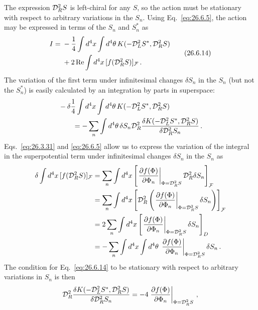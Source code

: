 The expression \(\mathcal{D}_R^2S\) is left-chiral for any \(S\), so the action
must be stationary with respect to arbitrary variations in the \(S_n\). Using
Eq.~\eqref{eq:26.6.5}, the action may be expressed in terms of the \(S_n\) and
\(S_n^*\) as
\begin{equation}
  \begin{aligned}
  I={}&-\frac14\int d^4x\int d^4\theta\,
  K(-\mathcal{D}_L^2S^*,\mathcal{D}_R^2S)
  \\
  &+2\operatorname{Re}\int d^4x\,
  [f(\mathcal{D}_R^2S)]_{\mathcal{F}}\,.
  \end{aligned}
  \tag{26.6.14}\label{eq:26.6.14}
\end{equation}
The variation of the first term under infinitesimal changes \(\delta S_n\) in
the \(S_n\) (but not the \(S_n^*\)) is easily calculated by an integration by
parts in superspace:
\[
  \begin{aligned}
  &-\delta\frac14\int d^4x\int d^4\theta\,
    K(-\mathcal{D}_L^2S^*,\mathcal{D}_R^2S)
  \\
  &\qquad=-\sum_n\int d^4\theta\,\delta S_n\mathcal{D}_R^2
    \frac{\delta K(-\mathcal{D}_L^2S^*,\mathcal{D}_R^2S)}
         {\delta\mathcal{D}_R^2S_n}\,.
  \end{aligned}
\]
Eqs.~\eqref{eq:26.3.31} and \eqref{eq:26.6.5} allow us to express the
variation of the integral in the superpotential term under infinitesimal
changes \(\delta S_n\) in the \(S_n\) as
\[
  \begin{aligned}
  \delta\int d^4x\,[f(\mathcal{D}_R^2S)]_{\mathcal{F}}
  &=
  \sum_n\int d^4x
  \left[
    \left.
    \frac{\partial f(\Phi)}{\partial\Phi_n}
    \right|_{\Phi=\mathcal{D}_R^2S}
    \mathcal{D}_R^2\delta S_n
  \right]_{\mathcal{F}}
  \\
  &=
  \sum_n\int d^4x
  \left[
    \mathcal{D}_R^2\left(
      \left.
      \frac{\partial f(\Phi)}{\partial\Phi_n}
      \right|_{\Phi=\mathcal{D}_R^2S}
      \delta S_n
    \right)
  \right]_{\mathcal{F}}
  \\
  &=2\sum_n\int d^4x
  \left[
    \left.
    \frac{\partial f(\Phi)}{\partial\Phi_n}
    \right|_{\Phi=\mathcal{D}_R^2S}
    \delta S_n
  \right]_D
  \\
  &=-\sum_n\int d^4x\int d^4\theta\,
    \left.
    \frac{\partial f(\Phi)}{\partial\Phi_n}
    \right|_{\Phi=\mathcal{D}_R^2S}
    \delta S_n\,.
  \end{aligned}
\]
The condition for Eq.~\eqref{eq:26.6.14} to be stationary with respect to
arbitrary variations in \(S_n\) is then
\[
  \mathcal{D}_R^2
  \frac{\delta K(-\mathcal{D}_L^2S^*,\mathcal{D}_R^2S)}
       {\delta\mathcal{D}_R^2S_n}
  =-4
  \left.
  \frac{\partial f(\Phi)}{\partial\Phi_n}
  \right|_{\Phi=\mathcal{D}_R^2S}\,,
\]
